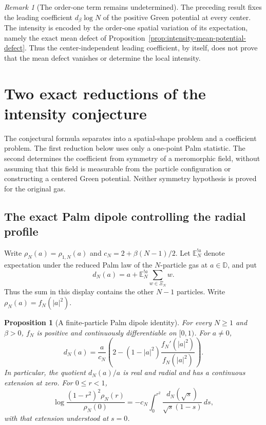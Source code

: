 \documentclass[11pt,a4paper]{article}
\numberwithin{equation}{section}
\newtheorem{proposition}[theorem]{Proposition}
\theoremstyle{definition}
\theoremstyle{remark}
\newtheorem{remark}[theorem]{Remark}
\newcommand{\D}{\mathbb D}
\newcommand{\E}{\mathbb E}
\begin{document}
\begin{remark}[The order-one term remains undetermined]
The preceding result fixes the leading coefficient $d_\beta\log N$ of
the positive Green potential at every center.  The intensity is encoded
by the order-one spatial variation of its expectation, namely the exact
mean defect of Proposition~\ref{prop:intensity-mean-potential-defect}.
Thus the center-independent leading coefficient, by itself, does not
prove that the mean defect vanishes or determine the local intensity.
\end{remark}


\section{Two exact reductions of the intensity conjecture}
\label{sec:intensity-palm-dipole-affine}

The conjectural formula separates into a spatial-shape problem and a
coefficient problem. The first reduction below uses only a one-point
Palm statistic. The second determines the coefficient from symmetry
of a meromorphic field, without assuming that this field is measurable
from the particle configuration or constructing a centered Green
potential. Neither symmetry hypothesis is proved for the original gas.

\subsection{The exact Palm dipole controlling the radial profile}

Write $\rho_N(a)=\rho_{1,N}(a)$ and
$c_N=2+\beta(N-1)/2$. Let $\E_N^{!a}$ denote expectation under
the reduced Palm law of the $N$-particle gas at $a\in\D$, and put
\[
 d_N(a)=a+\E_N^{!a}\sum_{w\in\Xi_N}w.
\]
Thus the sum in this display contains the other $N-1$ particles.
Write $\rho_N(a)=f_N(|a|^2)$.

\begin{proposition}[A finite-particle Palm dipole identity]
\label{prop:exact-intensity-palm-dipole}
For every $N\ge1$ and $\beta>0$, $f_N$ is positive and continuously
differentiable on $[0,1)$. For $a\ne0$,
\begin{equation}
 d_N(a)=\frac{a}{c_N}
 \left(2-(1-|a|^2)\frac{f_N'(|a|^2)}{f_N(|a|^2)}\right).
 \label{eq:exact-intensity-palm-dipole}
\end{equation}
In particular, the quotient $d_N(a)/a$ is real and radial and has a
continuous extension at zero. For $0\le r<1$,
\begin{equation}
 \log\frac{(1-r^2)^2\rho_N(r)}{\rho_N(0)}
 =-c_N\int_0^{r^2}
       \frac{d_N(\sqrt{s})}{\sqrt{s}(1-s)}\,ds,
 \label{eq:exact-intensity-profile-dipole}
\end{equation}
with that extension understood at $s=0$.
\end{proposition}
\end{document}
